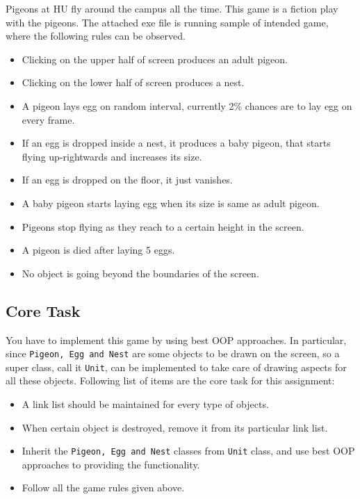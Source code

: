 \documentclass[a4paper,12pt]{article}
\begin{document}
	Pigeons at HU fly around the campus all the time. This game is a fiction play with the pigeons. The attached exe file is running sample of intended game, where the following rules can be observed.
	
	
	\begin{itemize}
		\item Clicking on the upper half of screen produces an adult pigeon.
		\item Clicking on the lower half of screen produces a nest.
		\item A pigeon lays egg on random interval, currently 2\% chances are to lay egg on every frame.
		\item If an egg is dropped inside a nest, it produces a baby pigeon, that starts flying up-rightwards and increases its size.
		\item If an egg is dropped on the floor, it just vanishes.
		\item A baby pigeon starts laying egg when its size is same as adult pigeon.
		\item Pigeons stop flying as they reach to a certain height in the screen.
		\item A pigeon is died after laying 5 eggs.
		\item No object is going beyond the boundaries of the screen.
	\end{itemize}
	
	\subsection{Core Task}
		You have to implement this game by using best OOP approaches. In particular, since \texttt{Pigeon, Egg and Nest} are some objects to be drawn on the screen, so a super class, call it \texttt{Unit}, can be implemented to take care of drawing aspects for all these objects. Following list of items are the core task for this assignment:
	\begin{itemize}
		\item A link list should be maintained for every type of objects.
		\item When certain object is destroyed, remove it from its particular link list.
		\item Inherit the \texttt{Pigeon, Egg and Nest} classes from \texttt{Unit} class, and use best OOP approaches to providing the functionality.
		\item Follow all the game rules given above.
	\end{itemize}
	
\end{document}
